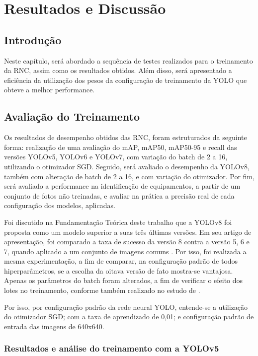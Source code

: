\chapter{Resultados e Discussão}

\section{Introdução} 

Neste capítulo, será abordado a sequência de testes realizados para o treinamento da RNC, assim como os resultados obtidos. Além disso, será apresentado a eficiência da utilização dos pesos da configuração de treinamento da YOLO que obteve a melhor performance. 

\section{Avaliação do Treinamento} 

Os resultados de desempenho obtidos das RNC, foram estruturados da seguinte forma: realização de uma avaliação do mAP, mAP50, mAP50-95 e recall das versões YOLOv5, YOLOv6 e YOLOv7, com variação do batch de 2 a 16, utilizando o otimizador SGD. Seguido, será avaliado o desempenho da YOLOv8, também com alteração de batch de 2 a 16, e com variação do otimizador. Por fim, será avaliado a performance na identificação de equipamentos, a partir de um conjunto de fotos não treinadas, e avaliar na prática a precisão real de cada configuração dos modelos, aplicadas. 

Foi discutido na Fundamentação Teórica deste trabalho que a YOLOv8 foi proposta como um modelo superior a suas três últimas versões. Em seu artigo de apresentação, foi comparado a taxa de sucesso da versão 8 contra a versão 5, 6 e 7, quando aplicado a um conjunto de imagens comuns \cite{ultralytics2023yolo}. Por isso, foi realizada a mesma experimentação, a fim de comparar, na configuração padrão de todos hiperparâmetros, se a escolha da oitava versão de fato mostra-se vantajosa. Apenas os parâmetros do batch foram alterados, a fim de verificar o efeito dos lotes no treinamento, conforme também realizado no estudo de \cite{almeida2023batch}.

Por isso, por configuração padrão da rede neural YOLO, entende-se a utilização do otimizador SGD; com a taxa de aprendizado de 0,01; e configuração padrão de entrada das imagens de 640x640. 

\subsection{Resultados e análise do treinamento com a YOLOv5}

